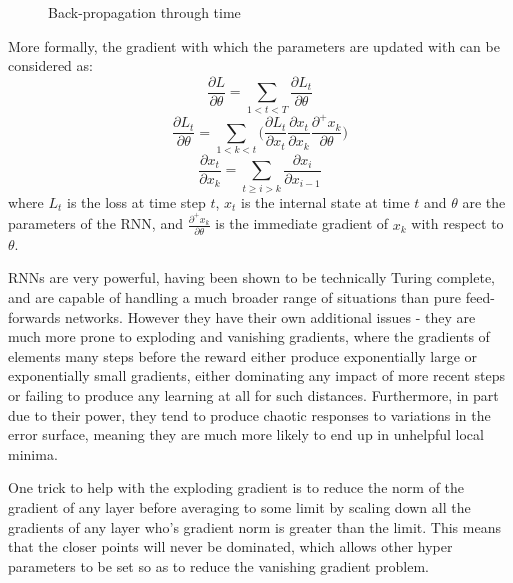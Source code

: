 \begin{figure}
\centering

\caption{Back-propagation through time}
\label{fig:bptt}
\end{figure}
More formally, the gradient with which the parameters are updated with can be considered as:
\begin{equation}
\frac{\partial L}{\partial \theta} = \sum_{1<t<T}\frac{\partial L_t}{\partial\theta}
\end{equation}
\begin{equation}
\frac{\partial L_t}{\partial\theta} = \sum_{1 < k< t} \big( \frac{\partial L_t}{\partial x_t}\frac{\partial x_t}{\partial x_k} \frac{\partial^+ x_k}{\partial\theta} \big)
\end{equation}
\begin{equation}
\frac{\partial x_t}{\partial x_k} =\sum_{t \geq i > k} \frac{\partial x_i}{\partial x_{i-1}} 
\end{equation}
 where $L_t$ is the loss at time step $t$, $x_t$ is the internal state at time $t$ and $\theta$ are the parameters of the RNN, and $\frac{\partial^+ x_k}{\partial\theta}$ is the immediate gradient of $x_k$ with respect to $\theta$. \cite{pascanu2012difficulty}
 
RNNs are very powerful, having been shown to be technically Turing complete, and are capable of handling a much broader range of situations than pure feed-forwards networks. However they have their own additional issues - they are much more prone to exploding and vanishing gradients, where the gradients of elements many steps before the reward either produce exponentially large or exponentially small gradients, either dominating any impact of more recent steps or failing to produce any learning at all for such distances. Furthermore, in part due to their power, they tend to produce chaotic responses to variations in the error surface, meaning they are much more likely to end up in unhelpful local minima.

One trick to help with the exploding gradient is to reduce the norm of the gradient of any layer before averaging to some limit by scaling down all the gradients of any layer who's gradient  norm is greater than the limit. This means that the closer points will never be dominated, which allows other hyper parameters to be set so as to reduce the vanishing gradient problem.

